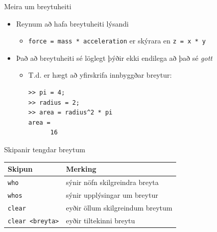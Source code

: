 \documentclass[handout]{beamer}
\begin{document}
\begin{frame}[fragile]{Meira um breytuheiti}
\begin{itemize}
 \item Reynum að hafa breytuheiti lýsandi
 \begin{itemize}
  \item \texttt{force = mass * acceleration} er skýrara en \texttt{z = x * y} 
 \end{itemize}
 \item Það að breytuheiti sé löglegt þýðir ekki endilega að það sé \emph{gott}
 \begin{itemize}
  \item T.d. er hægt að yfirskrifa innbyggðar breytur:
\begin{verbatim}
>> pi = 4;
>> radius = 2;
>> area = radius^2 * pi
area = 
      16
\end{verbatim}
 \end{itemize}
\end{itemize}
\end{frame}

\begin{frame}{Skipanir tengdar breytum}
\begin{center}
\begin{tabular}{ll}
\toprule
Skipun&Merking\\
\midrule
\texttt{who}&sýnir nöfn skilgreindra breyta\\
\texttt{whos}&sýnir upplýsingar um breytur\\
\texttt{clear}&eyðir öllum skilgreindum breytum\\
\texttt{clear <breyta>}&eyðir tiltekinni breytu\\
\bottomrule
\end{tabular}
\end{center}
\end{frame}
\end{document}
